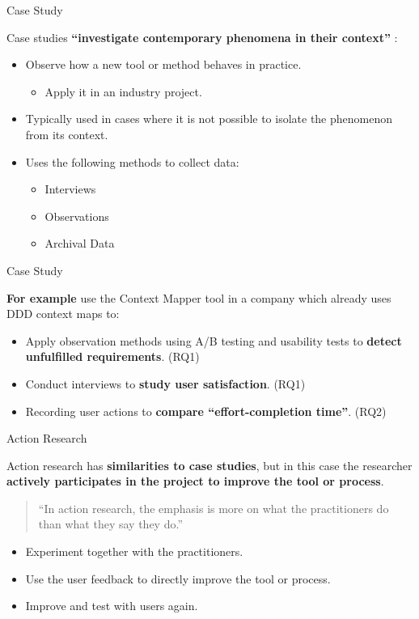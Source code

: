 \documentclass[10pt]{beamer}
\begin{document}
\begin{frame}{Case Study}
	
	Case studies \textbf{``investigate contemporary phenomena in their context''} \cite{Benbasat:1987:CRS:35194.35201,robson2002real,yin2009case}:
	
	\begin{itemize}
		\item Observe how a new tool or method behaves in practice.
		\begin{itemize}
			\item Apply it in an industry project.
		\end{itemize}
		\item Typically used in cases where it is not possible to isolate the phenomenon from its context.
		\item Uses the following methods to collect data:
		\begin{itemize}
			\item Interviews
			\item Observations
			\item Archival Data
		\end{itemize}
	\end{itemize}
	
\end{frame}

\begin{frame}{Case Study}

	\textbf{For example} use the Context Mapper tool in a company which already uses DDD context maps to:
	\bigskip
	\begin{itemize}
		\item Apply observation methods using A/B testing and usability tests to \textbf{detect unfulfilled requirements}. (RQ1)
		\bigskip
		\item Conduct interviews to \textbf{study user satisfaction}. (RQ1)
		\bigskip
		\item Recording user actions to \textbf{compare ``effort-completion time''}. (RQ2)
	\end{itemize}
	
\end{frame}

\begin{frame}{Action Research}
	
	Action research has \textbf{similarities to case studies}, but in this case the researcher \textbf{actively participates in the project to improve the tool or process}.
	
	\bigskip
	\begin{quotation}
		``In action research, the emphasis is more on what the practitioners do than what they say they do.'' \cite{Avison:1999:AR:291469.291479}
	\end{quotation}
	
	\begin{itemize}
		\item Experiment together with the practitioners.
		\item Use the user feedback to directly improve the tool or process.
		\item Improve and test with users again.
	\end{itemize}
\end{frame}
\end{document}
